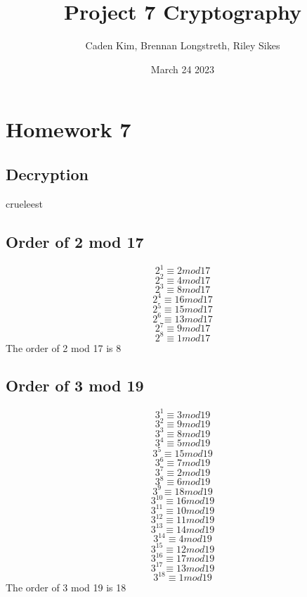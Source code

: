 \documentclass{article}
\title{Project 7 Cryptography}
\author{Caden Kim, Brennan Longstreth, Riley Sikes }
\date{March 24 2023}
\begin{document}
\maketitle

\section{Homework 7}

\subsection{Decryption}
crueleest
\subsection{Order of 2 mod 17}
$$2^1 \equiv 2 mod 17$$
$$2^2 \equiv 4 mod 17$$
$$2^3 \equiv 8 mod 17$$
$$2^4 \equiv 16 mod 17$$
$$2^5 \equiv 15 mod 17$$
$$2^6 \equiv 13 mod 17$$
$$2^7 \equiv 9 mod 17$$
$$2^8 \equiv 1 mod 17$$
The order of 2 mod 17 is 8

\subsection{Order of 3 mod 19}
$$3^1 \equiv 3 mod 19$$
$$3^2 \equiv 9 mod 19$$
$$3^3 \equiv 8 mod 19$$
$$3^4 \equiv 5 mod 19$$
$$3^5 \equiv 15 mod 19$$
$$3^6 \equiv 7 mod 19$$
$$3^7 \equiv 2 mod 19$$
$$3^8 \equiv 6 mod 19$$
$$3^9 \equiv 18 mod 19$$
$$3^10 \equiv 16 mod 19$$
$$3^11 \equiv 10 mod 19$$
$$3^12 \equiv 11 mod 19$$
$$3^13 \equiv 14 mod 19$$
$$3^14 \equiv 4 mod 19$$
$$3^15 \equiv 12 mod 19$$
$$3^16 \equiv 17 mod 19$$
$$3^17 \equiv 13 mod 19$$
$$3^18 \equiv 1 mod 19$$
The order of 3 mod 19 is 18
\end{document}
